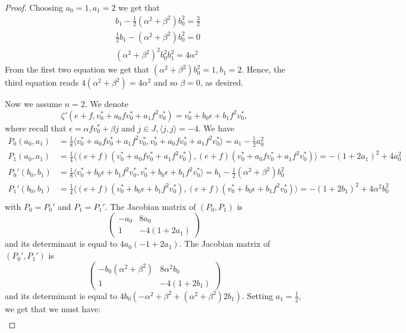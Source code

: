 \documentclass[11pt]{article}
\begin{document}
\begin{proof}
    Choosing $a_0=1, a_1 = 2$ we get that
    \[
    \begin{aligned}
        &b_1-\frac{1}{2}(\alpha^2+\beta^2)b_0^2 = \frac{3}{2}\\
        &\frac{1}{2}b_1 - (\alpha^2+\beta^2)b_0^2 = 0\\
        &(\alpha^2+\beta^2)^2b_0^2b_1^2 = 4\alpha^2
    \end{aligned}
    \]
    From the first two equation we get that $(\alpha^2+\beta^2)b_0^2=1, b_1=2$.
    Hence, the third equation reads $4(\alpha^2+\beta^2)=4\alpha^2$ and so $\beta=0$, as desired.

    Now we assume $n=2$.
    We denote $$\zeta'(e+f, v_0^* + a_0fv_0^* + a_1f^2v_0^*)= v_0^*+b_0\epsilon+b_1f^2v_0^*,$$
    where recall that $\epsilon = \alpha fv_0^* + \beta j$ and $j\in J, \langle j, j\rangle = -4$.
    We have
    \[\begin{aligned}
        P_0(a_0, a_1) &= \frac{1}{8}\langle v_0^* + a_0fv_0^* + a_1f^2v_0^*, v_0^* + a_0fv_0^* + a_1f^2v_0^*\rangle = a_1-\frac{1}{2}a_0^2\\
        P_1(a_0, a_1) &= \frac{1}{4}\langle (e+f)(v_0^* + a_0fv_0^* + a_1f^2v_0^*), (e+f) (v_0^* + a_0fv_0^* + a_1f^2v_0^*)\rangle = -(1+2a_1)^2 + 4a_0^2\\
        P_0'(b_0, b_1) &= \frac{1}{8}\langle v_0^*+b_0\epsilon+b_1f^2v_0^*, v_0^*+b_0\epsilon+b_1f^2v_0^*\rangle = b_1-\frac{1}{2}(\alpha^2+\beta^2)b_0^2\\
        P_1'(b_0, b_1) &= \frac{1}{4}\langle (e+f)(v_0^* + b_0\epsilon + b_1f^2v_0^*), (e+f) (v_0^* + b_0\epsilon + b_1f^2v_0^*)\rangle = -(1+2b_1)^2 + 4\alpha^2b_0^2\\
    \end{aligned}\]
    with $P_0 = P_0'$ and $P_1 = P_1'$.
    The Jacobian matrix of $(P_0, P_1)$ is $$\begin{pmatrix}
        -a_0 & 8a_0\\
        1 & -4(1+2a_1)
    \end{pmatrix}$$
    and its determinant is equal to $4a_0(-1+2a_1)$.
    The Jacobian matrix of $(P_0', P_1')$ is $$\begin{pmatrix}
        -b_0(\alpha^2+\beta^2)&8\alpha^2b_0\\
        1& -4(1+2b_1)
    \end{pmatrix}$$
    and its determinant is equal to $4b_0(-\alpha^2+\beta^2+(\alpha^2+\beta^2)2b_1)$.
    Setting $a_1 = \frac{1}{2}$, we get that we must have:
    \[
    \begin{aligned}

\end{aligned}\]
\end{proof}
\end{document}
